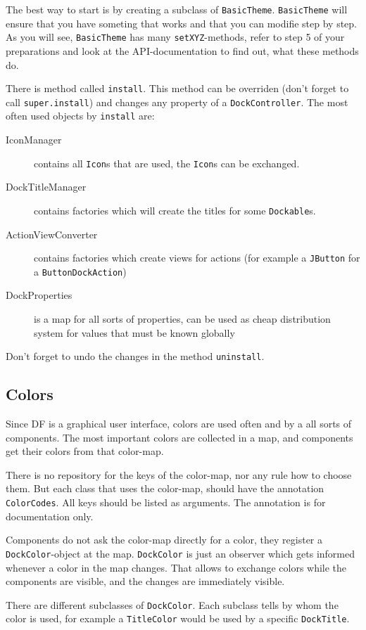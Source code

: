 \documentclass[a4paper,10pt]{article}
\newcommand{\src}[1]{\lstinline[basicstyle=\normalsize\ttfamily,keywordstyle=\normalsize\ttfamily,identifierstyle=\normalsize\ttfamily]|#1|}
\begin{document}
The best way to start is by creating a subclass of \src{BasicTheme}. \src{BasicTheme} will ensure that you have someting that works and that you can modifie step by step. As you will see, \src{BasicTheme} has many \src{setXYZ}-methods, refer to step 5 of your preparations and look at the API-documentation to find out, what these methods do.

There is method called \src{install}. This method can be overriden (don't forget to call \src{super.install}) and changes any property of a \src{DockController}. The most often used objects by \src{install} are:
\begin{description}
 \item[IconManager] contains all \src{Icon}s that are used, the \src{Icon}s can be exchanged.
 \item[DockTitleManager] contains factories which will create the titles for some \src{Dockable}s.
 \item[ActionViewConverter] contains factories which create views for actions (for example a \src{JButton} for a \src{ButtonDockAction})
 \item[DockProperties] is a map for all sorts of properties, can be used as cheap distribution system for values that must be known globally
\end{description}

Don't forget to undo the changes in the method \src{uninstall}.

\subsection{Colors}
Since DF is a graphical user interface, colors are used often and by a all sorts of components. The most important colors are collected in a map, and components get their colors from that color-map.

There is no repository for the keys of the color-map, nor any rule how to choose them. But each class that uses the color-map, should have the annotation \src{ColorCodes}. All keys should be listed as arguments. The annotation is for documentation only.

Components do not ask the color-map directly for a color, they register a \src{DockColor}-object at the map. \src{DockColor} is just an observer which gets informed whenever a color in the map changes. That allows to exchange colors while the components are visible, and the changes are immediately visible.

There are different subclasses of \src{DockColor}. Each subclass tells by whom the color is used, for example a \src{TitleColor} would be used by a specific \src{DockTitle}.
\end{document}
